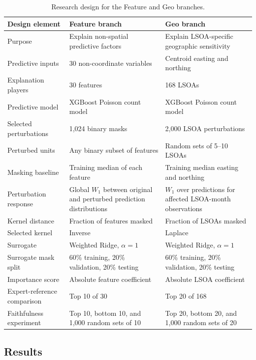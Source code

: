 \begin{table}[H]
\centering
\caption{Research design for the Feature and Geo branches.}
\label{tab:hull_research_design}
\small
\begin{tabularx}{\textwidth}{p{} X X}
\toprule
Design element & Feature branch & Geo branch \\
\midrule
Purpose & Explain non-spatial predictive factors & Explain LSOA-specific geographic sensitivity \\
Predictive inputs & 30 non-coordinate variables & Centroid easting and northing \\
Explanation players & 30 features & 168 LSOAs \\
Predictive model & XGBoost Poisson count model & XGBoost Poisson count model \\
Selected perturbations & 1,024 binary masks & 2,000 LSOA perturbations \\
Perturbed units & Any binary subset of features & Random sets of 5--10 LSOAs \\
Masking baseline & Training median of each feature & Training median easting and northing \\
Perturbation response & Global $W_1$ between original and perturbed prediction distributions & $W_1$ over predictions for affected LSOA-month observations \\
Kernel distance & Fraction of features masked & Fraction of LSOAs masked \\
Selected kernel & Inverse & Laplace \\
Surrogate & Weighted Ridge, $\alpha=1$ & Weighted Ridge, $\alpha=1$ \\
Surrogate mask split & 60\% training, 20\% validation, 20\% testing & 60\% training, 20\% validation, 20\% testing \\
Importance score & Absolute feature coefficient & Absolute LSOA coefficient \\
Expert-reference comparison & Top 10 of 30 & Top 20 of 168 \\
Faithfulness experiment & Top 10, bottom 10, and 1,000 random sets of 10 & Top 20, bottom 20, and 1,000 random sets of 20 \\
\bottomrule
\end{tabularx}
\end{table}

\subsection{Results}
\label{sec:hull_results}

